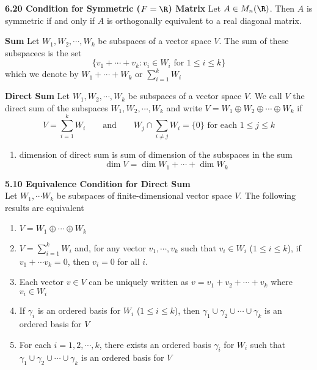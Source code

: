\documentclass[11pt]{article}
\begin{document}
\begin{theorem*}
    \textbf{6.20 Condition for Symmetric ($F=\R$) Matrix} Let $A \in M_{n}(\R)$. Then $A$ is symmetric if and only if $A$ is orthogonally equivalent to a real diagonal matrix.
\end{theorem*}




\begin{defn*}
    \textbf{Sum} Let $W_1, W_2,\cdots, W_k$ be subspaces of a vector space $V$. The sum of these subspacecs is the set 
    \[
        \{v_1 + \cdots + v_k : v_i \in W_i \text{ for } 1 \leq i \leq k\}    
    \]
    which we denote by $W_1 + \cdots + W_k$ or $\textstyle\sum_{i=1}^k W_i$
\end{defn*}

\begin{defn*}
    \textbf{Direct Sum} Let $W_1, W_2, \cdots, W_k$ be subspaces of a vector space $V$. We call $V$ the direct sum of the subspaces $W_1, W_2, \cdots, W_k$ and write $V = W_1 \oplus W_2 \oplus \cdots \oplus W_k$ if 
    \[
        V = \sum_{i=1}^k W_i    
        \qquad \text{and} \qquad 
        W_j \cap \sum_{i\neq j} W_i = \{ 0\} \text{ for each } 1 \leq j \leq k
    \]
    \begin{enumerate}
        \item dimension of direct sum is sum of dimension of the subspaces in the sum
        \[
            \dim{V} = \dim{W_1} + \cdots + \dim{W_k}
        \]
    \end{enumerate}
\end{defn*}


\begin{theorem*}
    \textbf{5.10 Equivalence Condition for Direct Sum} \\
    Let $W_1, \cdots W_k$ be subspaces of finite-dimensional vector space $V$. The following results are equivalent
    \begin{enumerate}
        \item $V = W_1 \oplus \cdots \oplus W_k$ 
        \item $V = \textstyle\sum_{i=1}^k W_i$ and, for any vector $v_1, \cdots, v_k$ such that $v_i \in W_i$ ($1\leq i \leq k$), if $v_1 + \cdots v_k = 0$, then $v_i = 0$ for all $i$.
        \item Each vector $v\in V$ can be uniquely written as $v = v_1 + v_2 + \cdots + v_k$ where $v_i \in W_i$ 
        \item If $\gamma_i$ is an ordered basis for $W_i$ ($1\leq i \leq k$), then $\gamma_1 \cup \gamma_2 \cup \cdots \cup \gamma_k$ is an ordered basis for $V$
        \item For each $i = 1,2,\cdots, k$, there exists an ordered basis $\gamma_i$ for $W_i$ such that $\gamma_1 \cup \gamma_2 \cup\cdots \cup \gamma_k$ is an ordered basis for $V$ 
    \end{enumerate}
\end{theorem*}
\end{document}
